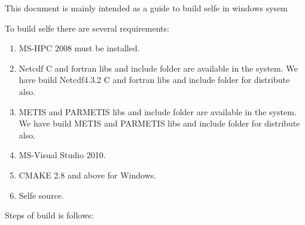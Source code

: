 \documentclass[12pt]{report}
\begin{document}
\lstset{basicstyle=\ttfamily\tiny}


This document is mainly intended as a guide to build selfe in windows sysem

To build selfe there are several requirements:
\begin{enumerate}
\item MS-HPC 2008 must be installed.
\item Netcdf C and fortran libs and include folder are available in the system. 
      We have build  Netcdf4.3.2 C and fortran libs and include folder for distribute
			also.
\item METIS and PARMETIS libs and include folder are available in the system.
      We have build  METIS and PARMETIS libs and include folder for distribute
			also.
\item MS-Visual Studio 2010.
\item CMAKE 2.8 and above for Windows.
\item Selfe source.
\end{enumerate}


Steps of build is follows:
\end{document}
